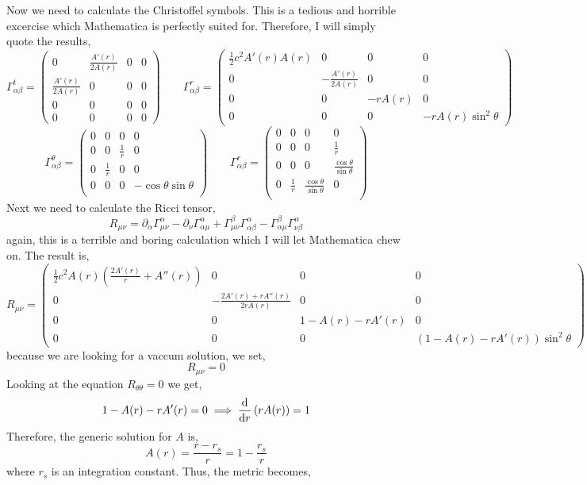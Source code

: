 \documentclass[11pt, a4paper]{article}
\begin{document}
Now we need to calculate the Christoffel symbols. This is a tedious and horrible excercise which Mathematica is perfectly suited for. Therefore, I will simply quote the results,
\[
\Gamma^t_{\alpha \beta} = 
\begin{pmatrix}
0 & \frac{A'(r)}{2 A(r)} & 0 & 0 \\
\frac{A'(r)}{2 A(r)} & 0 & 0 & 0 \\
0 & 0 & 0 & 0 \\
0 & 0 & 0 & 0
\end{pmatrix}
\quad \quad 
\Gamma^r_{\alpha \beta} = 
\begin{pmatrix}
\tfrac{1}{2} c^2 A'(r) A(r) & 0 & 0 & 0 \\
0 & - \frac{A'(r)}{2 A(r)} & 0 & 0 \\
0 & 0 & - r A(r) & 0 \\
0 & 0 & 0 & - r A(r) \sin^2{\theta}
\end{pmatrix}
\]
\[
\Gamma^\theta_{\alpha \beta} = 
\begin{pmatrix}
0 & 0 & 0 & 0 \\
0 & 0 & \frac{1}{r} & 0 \\
0 & \frac{1}{r} & 0 & 0 \\
0 & 0 & 0 & - \cos{\theta} \sin{\theta} \\
\end{pmatrix}
\quad \quad 
\Gamma^r_{\alpha \beta} = 
\begin{pmatrix}
0 & 0 & 0 & 0 \\
0 & 0 & 0 & \frac{1}{r} \\
0 & 0 & 0 & \frac{\cos{\theta}}{\sin{\theta}} \\
0 & \frac{1}{r} & \frac{\cos{\theta}}{\sin{\theta}} & 0 \\
\end{pmatrix}
\]
Next we need to calculate the Ricci tensor,
\[ R_{\mu \nu} = \partial_{\alpha} \Gamma^{\alpha}_{\mu \nu} - \partial_{\nu} \Gamma^{\alpha}_{\alpha \mu} + \Gamma^{\beta}_{\mu \nu} \Gamma^{\alpha}_{\alpha \beta} - \Gamma^{\beta}_{\alpha \mu} \Gamma^{\alpha}_{\nu \beta} \] 
again, this is a terrible and boring calculation which I will let Mathematica chew on. The result is,
\[
R_{\mu \nu} = 
\begin{pmatrix}
\tfrac{1}{2} c^2 A(r) \left( \frac{2 A'(r)}{r} + A''(r) \right) & 0 & 0 & 0 \\ 
0 & - \frac{2 A'(r) + r A''(r)}{2 r A(r)} & 0 & 0 \\
0 & 0 & 1 - A(r) - r A'(r) & 0 \\
0 & 0 & 0 & (1 - A(r) - r A'(r)) \sin^2{\theta} 
\end{pmatrix}
\]
because we are looking for a vaccum solution, we set,
\[ R_{\mu \nu} = 0 \]
Looking at the equation $R_{\theta \theta} = 0$ we get,
\[ 1 - A(r) - r A'(r) = 0 \implies \frac{\mathrm{d}}{\mathrm{d}r} \left( r A(r) \right) = 1 \]
Therefore, the generic solution for $A$ is,
\[ A(r) = \frac{r - r_s}{r} = 1 - \frac{r_s}{r} \]
where $r_s$ is an integration constant. Thus, the metric becomes, 
\newcommand{\sfactor}{\left(1 - \frac{r_s}{r} \right)}
\end{document}

